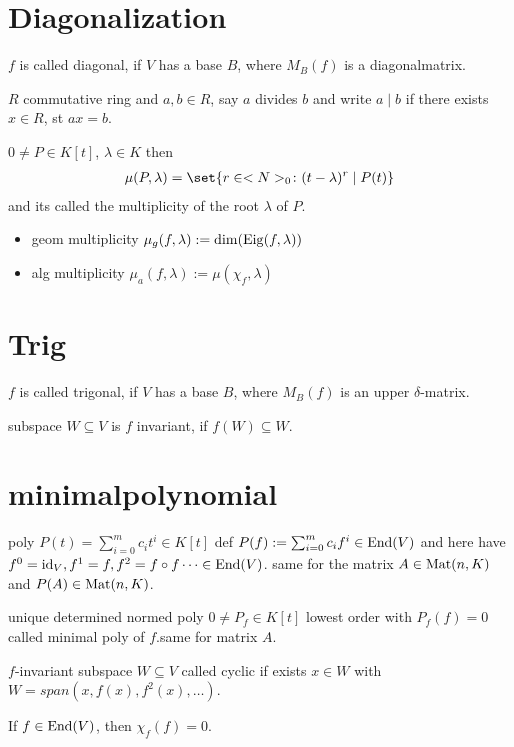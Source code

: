 \section{Diagonalization}
\begin{definition}
	$f$ is called diagonal, if $V$ has a base $B$, where $M_B(f)$ is a diagonalmatrix.
\end{definition}
\begin{definition}
	$R$ commutative ring and $a,b \in R$, say $a$ divides $b$ and write $a\mid b$ if there exists $x \in R$, st $ax = b$.
\end{definition}
\begin{definition}
	$0 \neq P \in K[t]$, $\lambda \in K$ then
	\begin{align*}
		\mu(P,\lambda) = \set{r \in \N_0 \colon (t-\lambda)^r \mid P(t)}
	\end{align*}
	and its called the multiplicity of the root $\lambda$ of $P$.
	\begin{itemize}
		\item geom multiplicity $\mu_g(f,\lambda) := \dim(\operatorname{Eig}(f,\lambda))$
		\item alg multiplicity $\mu_a(f,\lambda) := \mu(\chi_f, \lambda)$ 
	\end{itemize}
\end{definition}
\section{Trig}
\begin{definition}
	$f$ is called trigonal, if $V$ has a base $B$, where $M_B(f)$ is an upper $\delta$-matrix.
\end{definition}
\begin{definition}
	subspace $W \subseteq V$ is $f$ invariant, if $f(W) \subseteq W$.
\end{definition}
\section{minimalpolynomial}
\begin{definition}
	poly $P(t)= \sum_{i=0}^m  c_i t^i \in K[t]$ def $P(f):= \sum_{i=0}^m c_i f^i \in \operatorname{End}(V)$ and here have $f^0 = \operatorname{id}_V, f^1 = f, f^2 = f\circ f \dots \in \operatorname{End}(V)$. same for the matrix $A \in \operatorname{Mat}(n,K)$ and $P(A) \in \operatorname{Mat}(n,K)$.
\end{definition}
\begin{definition}
	unique determined normed poly $0\neq P_f \in K[t]$ lowest order with $P_f(f) = 0$ called minimal poly of $f$.same for matrix $A$. 
\end{definition}
\begin{definition}
	$f$-invariant subspace $W \subseteq V$ called cyclic if exists $x \in W$ with $W = span(x,f(x),f^2(x), \dots)$.
\end{definition}
\begin{theorem}
	If $f \in \operatorname{End}(V)$, then $\chi_f(f) = 0$.
\end{theorem}
